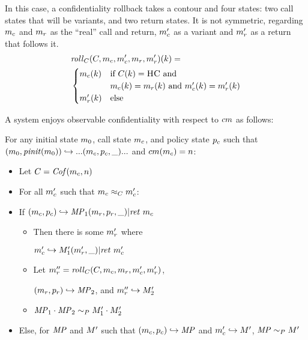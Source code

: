 \documentclass[conference]{IEEEtran}
\begin{document}
      In this case, a confidentiality rollback takes a contour and four states: two call states
      that will be variants, and two return states. It is not symmetric, regarding \(m_c\) and \(m_r\)
      as the ``real'' call and return, \(m_c'\) as a variant and \(m_r'\) as a return that follows it.
      \[\begin{split}
        & \mathit{roll}_C(C,m_c,m_c',m_r,m_r')(k) = \\
        & \begin{cases}
          m_c(k) & \text{if } C(k) = \textsc{HC} \text{ and } \\
                  & m_c(k) = m_r(k) \text{ and }
                    m_c'(k) = m_r'(k) \\
          m_r'(k) & \text{else} \\
        \end{cases}
      \end{split}\]

      A system enjoys observable confidentiality with respect to \(cm\) as follows:

      For any initial state \(m_0\), call state \(m_c\), and policy state \(p_c\) such that
      \((m_0,\mathit{pinit}(m_0)) \hookrightarrow ... (m_c,p_c,\_) ...\) and
      \(cm(m_c) = n\):

      \begin{itemize}
        \item Let \(C = \mathit{Cof}(m_c,n)\)
        \item For all \(m_c'\) such that \(m_c \approx_C m_c'\):
        \item If \((m_c,p_c) \hookrightarrow \mathit{MP}_1 (m_r,p_r,\_) | \mathit{ret}\ m_c\)
          \begin{itemize}
            \item Then there is some \(m_r'\) where

              \(m_c' \hookrightarrow M_1' (m_r',\_) | \mathit{ret}\ m_c'\)
            \item Let \(m_r'' = \mathit{roll}_C(C,m_c,m_r,m_c',m_r')\),

              \((m_r,p_r) \hookrightarrow \mathit{MP}_2\), and \(m_r'' \hookrightarrow M_2'\)
            \item \(\mathit{MP}_1 \cdot \mathit{MP}_2 \sim_P M_1' \cdot M_2'\)
          \end{itemize}
        \item Else, for \(\mathit{MP}\) and \(M'\) such that \((m_c,p_c) \hookrightarrow \mathit{MP}\)
          and \(m_c' \hookrightarrow M'\), \(\mathit{MP} \sim_P M'\)
      \end{itemize}

\end{document}
